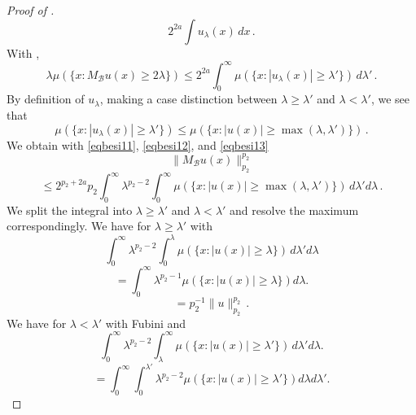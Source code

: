 \documentclass[10pt,a4paper]{article}
\theoremstyle{plain}
\theoremstyle{definition}
\numberwithin{equation}{subsection}
\begin{document}
\begin{proof}[Proof of ]
\begin{equation}
   2^{2a}
    \int u_\lambda (x)\, dx\, .
\end{equation}
With ,
\begin{equation}\label{eqbesi12}
    \lambda \mu(\{x: M_{\mathcal{B}}u(x)\ge 2\lambda\})\le
   2^{2a}
    \int_0^\infty \mu (\{x: |u_\lambda (x)|\ge \lambda'\})\, d\lambda'\, .
\end{equation}
By definition of $u_\lambda$, making a case distinction between $\lambda\ge \lambda'$ and $\lambda <\lambda'$, we see that
\begin{equation}\label{eqbesi13}
   \mu (\{x: |u_\lambda (x)|\ge \lambda'\})
   \le
   \mu (\{x: |u (x)|\ge \max(\lambda,\lambda')\})\, .
\end{equation}
We obtain with \eqref{eqbesi11},
\eqref{eqbesi12}, and \eqref{eqbesi13}
\begin{equation}
    \|M_{\mathcal{B}}u(x)\|_{p_2}^{p_2}
 \end{equation}
 \begin{equation}
   \le 2^{p_2+2a} p_2
   \int_0^\infty \lambda^{p_2-2}
   \int_0^\infty
   \mu (\{x: |u (x)|\ge \max(\lambda,\lambda')\})
   \, d\lambda'd\lambda\, .
\end{equation}
We split the integral into $\lambda\ge \lambda'$ and $\lambda<\lambda'$ and resolve the
maximum correspondingly.
We have for $\lambda\ge \lambda'$
with 
\begin{equation}
    \int_0^\infty \lambda^{p_2-2}
   \int_0^\lambda
   \mu (\{x: |u (x)|\ge \lambda\})
   \, d\lambda'd\lambda
\end{equation}
\begin{equation}
   =\int_0^\infty \lambda^{p_2-1}
     \mu (\{x: |u (x)|\ge \lambda\})
d\lambda.
\end{equation}
\begin{equation}\label{eqbesi14}
   =p_2^{-1} \|u\|_{p_2}^{p_2}\, .
\end{equation}
We have for $\lambda< \lambda'$
with Fubini and 
\begin{equation}
    \int_0^\infty \lambda^{p_2-2}
   \int_\lambda^\infty
   \mu (\{x: |u(x)|\ge \lambda'\})
   \, d\lambda'd\lambda.
\end{equation}
\begin{equation}
   =\int_0^\infty \int_0^{\lambda'}\lambda^{p_2-2}
     \mu (\{x: |u (x)|\ge \lambda'\})
d\lambda d\lambda'.
\end{equation}
\begin{equation}

\end{equation}
\end{proof}
\end{document}
